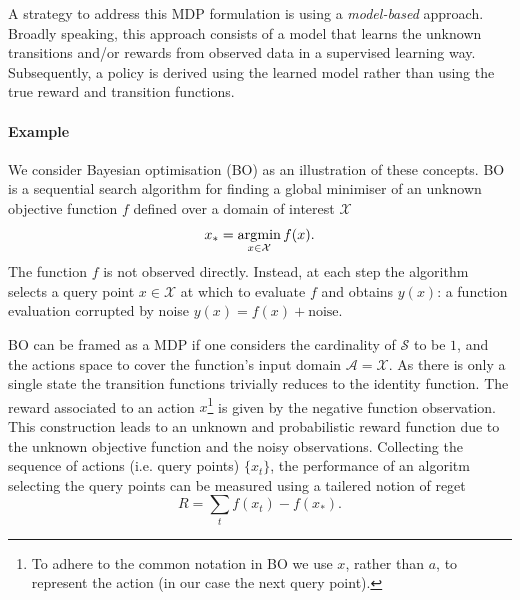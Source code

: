 A strategy to address this MDP formulation is using a \emph{model-based} approach. Broadly speaking, this approach consists of a model that learns the unknown transitions and/or rewards from observed data in a supervised learning way. Subsequently, a policy is derived using the learned model rather than using the true reward and transition functions. %

\paragraph{Example}
We consider Bayesian optimisation (BO) \citep{movckus1975bayesian} as an illustration of these concepts. BO is a sequential search algorithm for finding a global minimiser of an unknown objective function $f$ defined over a domain of interest $\mathcal{X}$
\begin{equation}
    x_* = \operatorname*{\arg\!\min}_{x \in \mathcal{X}} f(x).
\end{equation}
The function $f$ is not observed directly. Instead, at each step the algorithm selects a query point $x \in \mathcal{X}$ at which to evaluate $f$ and obtains $y(x)$: a function evaluation corrupted by noise $y(x) = f(x) + \textrm{noise}$.

BO can be framed as a MDP if one considers the cardinality of $\mathcal{S}$ to be $1$, and the actions space to cover the function's input domain $\mathcal{A} = \mathcal{X}$. As there is only a single state the transition functions trivially reduces to the identity function. The reward associated to an action $x$\footnote{To adhere to the common notation in BO we use $x$, rather than $a$, to represent the action (in our case the next query point).} is given by the negative function observation. This construction leads to an unknown and probabilistic reward  function due to the unknown objective function and the noisy observations. Collecting the sequence of actions (i.e. query points) $\{x_t\}$, the performance of an algoritm selecting the query points can be measured using a tailered notion of reget
\begin{equation}
  \label{eq:regret-bo}
    R = \sum_t f(x_t) - f(x_*).
\end{equation}

